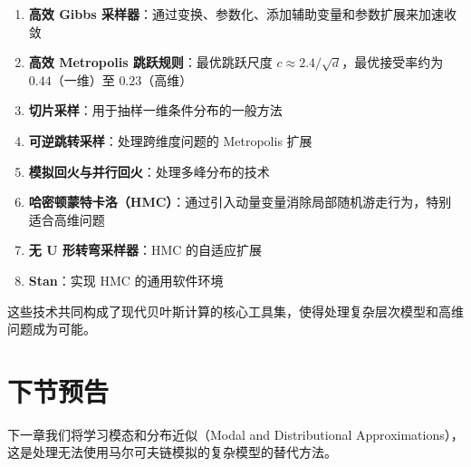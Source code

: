 \begin{enumerate}
  \item \textbf{高效 Gibbs 采样器}：通过变换、参数化、添加辅助变量和参数扩展来加速收敛
  \item \textbf{高效 Metropolis 跳跃规则}：最优跳跃尺度 $c \approx 2.4 / \sqrt{d}$，最优接受率约为 $0.44$（一维）至 $0.23$（高维）
  \item \textbf{切片采样}：用于抽样一维条件分布的一般方法
  \item \textbf{可逆跳转采样}：处理跨维度问题的 Metropolis 扩展
  \item \textbf{模拟回火与并行回火}：处理多峰分布的技术
  \item \textbf{哈密顿蒙特卡洛（HMC）}：通过引入动量变量消除局部随机游走行为，特别适合高维问题
  \item \textbf{无 U 形转弯采样器}：HMC 的自适应扩展
  \item \textbf{Stan}：实现 HMC 的通用软件环境
\end{enumerate}

这些技术共同构成了现代贝叶斯计算的核心工具集，使得处理复杂层次模型和高维问题成为可能。

\section{下节预告}

下一章我们将学习模态和分布近似（Modal and Distributional Approximations），这是处理无法使用马尔可夫链模拟的复杂模型的替代方法。

\endinput
